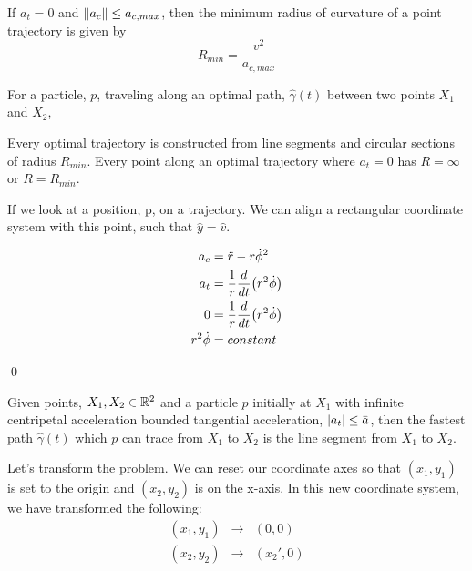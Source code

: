\begin{lemma}
If $a_t=0$ and $\norm{a_c} \le a_{c,max}$, then the minimum radius of curvature of a point trajectory is given by
\begin{equation}
R_{min} = \frac{v^2}{a_{c,max}}
\end{equation}
\end{lemma}

\begin{theorem}
For a particle, $p$, traveling along an optimal path, $\hat{\gamma}(t)$ between two points $X_1$ and $X_2$, 
\end{theorem}

\begin{lemma}
Every optimal trajectory is constructed from line segments and circular sections of radius $R_{min}$. Every point along an optimal trajectory where $a_t=0$ has $R = \infty$ or $R = R_{min}$.
\end{lemma}

\proof

If we look at a position, p, on a trajectory. We can align a rectangular coordinate system with this point, such that $\hat{y} = \hat{v}$.

\begin{align}
a_c& = \ddot{r} - r \dot{\phi}^2\\
%
a_t& = \frac{1}{r} \frac{d}{dt} \paren{r^2 \dot{\phi}}\\
%
0& = \frac{1}{r} \frac{d}{dt} \paren{r^2 \dot{\phi}}\\
%
r^2 \dot{\phi}& = constant
\end{align}

\qed


\begin{theorem}
  Given points, $X_1, X_2 \in \mathbb R^2$ and a particle $p$ initially at $X_1$ with infinite centripetal acceleration bounded tangential acceleration, $\abs{a_t} \le \bar{a}$, then the fastest path $\hat{\gamma}(t)$ which $p$ can trace from $X_1$ to $X_2$ is the line segment from $X_1$ to $X_2$.
\end{theorem}

\proof 

Let's transform the problem. We can reset our coordinate axes so that $(x_1, y_1)$ is set to the origin and $(x_2, y_2)$ is on the x-axis. In this new coordinate system, we have transformed the following:
\begin{eqnarray}
  (x_1, y_1) &\to& (0,0) \\
  (x_2, y_2) &\to& (x_2', 0)
\end{eqnarray}

